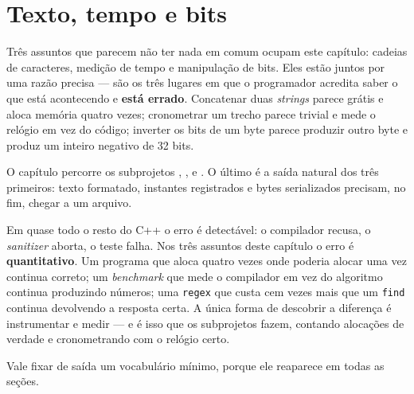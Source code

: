
\section{Texto, tempo e bits}
\label{sec:texto-tempo-bits}

Três assuntos que parecem não ter nada em comum ocupam este capítulo: cadeias de
caracteres, medição de tempo e manipulação de bits. Eles estão juntos por uma
razão precisa --- são os três lugares em que o programador acredita saber o que
está acontecendo e \textbf{está errado}. Concatenar duas \emph{strings} parece
grátis e aloca memória quatro vezes; cronometrar um trecho parece trivial e
mede o relógio em vez do código; inverter os bits de um byte parece produzir
outro byte e produz um inteiro negativo de 32 bits.

O capítulo percorre os subprojetos , ,
 e . O último é a saída natural dos três
primeiros: texto formatado, instantes registrados e bytes serializados
precisam, no fim, chegar a um arquivo.

\begin{porque}
Em quase todo o resto do C++ o erro é detectável: o compilador recusa, o
\emph{sanitizer} aborta, o teste falha. Nos três assuntos deste capítulo o erro
é \textbf{quantitativo}. Um programa que aloca quatro vezes onde poderia alocar
uma vez continua correto; um \emph{benchmark} que mede o compilador em vez do
algoritmo continua produzindo números; uma \texttt{regex} que custa cem vezes
mais que um \texttt{find} continua devolvendo a resposta certa. A única forma
de descobrir a diferença é instrumentar e medir --- e é isso que os subprojetos
fazem, contando alocações de verdade e cronometrando com o relógio certo.
\end{porque}

Vale fixar de saída um vocabulário mínimo, porque ele reaparece em todas as
seções.

